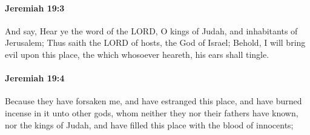 		\paragraph{Jeremiah 19:3} %
			\label{JEREMIAH-19-3}

			And say, Hear ye the word of the LORD, O kings of Judah, and inhabitants of Jerusalem; Thus saith the LORD of hosts, the God of Israel; Behold, I will bring evil upon this place, the which whosoever heareth, his ears shall tingle.


		\paragraph{Jeremiah 19:4} %
			\label{JEREMIAH-19-4}

			Because they have forsaken me, and have estranged this place, and have burned incense in it unto other gods, whom neither they nor their fathers have known, nor the kings of Judah, and have filled this place with the blood of innocents;

